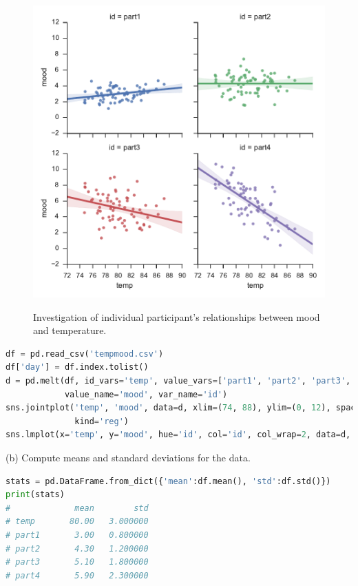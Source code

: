 \documentclass[onecolumn,10pt]{jhwhw}
\begin{document}
\begin{figure}[t!]
\begin{center}
\includegraphics[height=0.5\textheight]{p1-persubj.pdf}
\label{fig:on}
\end{center}
\caption{Investigation of individual participant's relationships between mood and temperature.}
\end{figure}
\begin{lstlisting}[language=Python]
df = pd.read_csv('tempmood.csv')
df['day'] = df.index.tolist()
d = pd.melt(df, id_vars='temp', value_vars=['part1', 'part2', 'part3', 'part4'],
            value_name='mood', var_name='id')
sns.jointplot('temp', 'mood', data=d, xlim=(74, 88), ylim=(0, 12), space=0,
              kind='reg')
sns.lmplot(x='temp', y='mood', hue='id', col='id', col_wrap=2, data=d, size=3)
\end{lstlisting}

\clearpage
\noindent (b) Compute means and standard deviations for the data.
\begin{lstlisting}[language=Python]
stats = pd.DataFrame.from_dict({'mean':df.mean(), 'std':df.std()})
print(stats)
#             mean        std
# temp       80.00   3.000000
# part1       3.00   0.800000
# part2       4.30   1.200000
# part3       5.10   1.800000
# part4       5.90   2.300000
\end{lstlisting}
\end{document}
